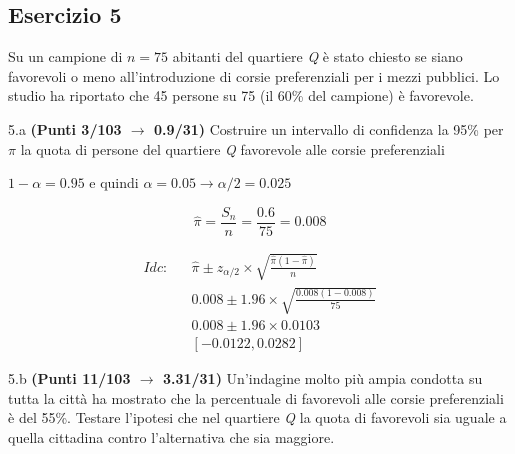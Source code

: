 \documentclass[
  11pt,
]{book}
\theoremstyle{mytheoremstyle}
\theoremstyle{mydefstyle}
\newenvironment{sol}
  {
  \begin{tcolorbox}[enhanced,breakable,arc=0.1mm,boxrule=1pt,colback=white,colframe=iblue,
  title=\bf \fontfamily{lmss}\selectfont \hspace{.5 cm} Soluzione,drop fuzzy shadow]

}{
\end{tcolorbox}
  }
\begin{document}
\subsection{Esercizio 5}\label{esercizio-5-12}

Su un campione di \(n=75\) abitanti del quartiere \emph{Q} è stato chiesto se siano favorevoli o meno all'introduzione di corsie preferenziali per i mezzi pubblici. Lo studio ha riportato che 45 persone su 75 (il 60\% del campione) è favorevole.

5.a \textbf{(Punti 3/103 \(\rightarrow\) 0.9/31)} Costruire un intervallo di confidenza la 95\% per \(\pi\) la quota di persone del quartiere \emph{Q} favorevole alle corsie preferenziali

\begin{sol}
\(1-\alpha =0.95\) e quindi \(\alpha=0.05\rightarrow \alpha/2=0.025\)

\[
  \hat\pi = \frac{S_n}n = \frac{ 0.6 }{ 75 }= 0.008 
\]

\begin{eqnarray*}
  Idc: & &  \hat\pi \pm  z_{\alpha/2} \times \sqrt{\frac{\hat\pi(1-\hat\pi)}{n}} \\
     & &  0.008 \pm  1.96 \times \sqrt{\frac{ 0.008 (1- 0.008 )}{ 75 }} \\
     & &  0.008 \pm  1.96 \times  0.0103 \\
     & & [ -0.0122 ,  0.0282 ]
\end{eqnarray*}

\end{sol}

5.b \textbf{(Punti 11/103 \(\rightarrow\) 3.31/31)} Un'indagine molto più ampia condotta su tutta la città ha mostrato che
la percentuale di favorevoli alle corsie preferenziali è del 55\%. Testare l'ipotesi che nel quartiere \emph{Q} la quota di favorevoli sia uguale a quella cittadina contro l'alternativa che sia maggiore.
\end{document}
